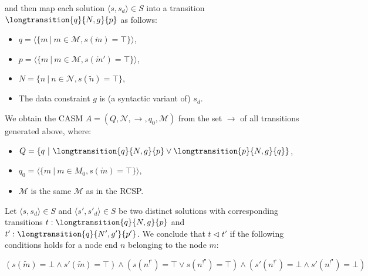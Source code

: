 and then map each solution $\langle s, s_d \rangle \in S$ into a transition $\longtransition{q}{N, g}{p}$ as follows: 
\begin{itemize}
	\item $q = \langle\{m ~|~ m \in \mathcal{M}, s\left(\mathring{m}\right) = \top \}\rangle$,
	\item $p = \langle\{m ~|~ m \in \mathcal{M}, s\left(\mathring{m}'\right) = \top \}\rangle$,
	\item $N =  \{ n ~|~ n \in \mathcal{N}, s\left(\tilde{n}\right) = \top \}$,%
	\item The data constraint $g$ is (a syntactic variant of) $s_d$. 
\end{itemize} 

We obtain the CASM $A=\left( Q, \mathcal{N}, \rightarrow, q_0, \mathcal{M} \right)$ from the set $\longrightarrow$ of all transitions generated above, where: %
\begin{itemize}
	\item $Q = \{q ~|~ \longtransition{q}{N, g}{p} \vee \longtransition{p}{N, g}{q} \}$, 
	\item $q_0 = \langle\{m~|~ m \in M_0, s(\mathring{m}) = \top \}\rangle$, 
	\item $\mathcal{M}$ is the same $\mathcal{M}$ as in the RCSP.
\end{itemize}

Let $\langle s, s_d \rangle \in S$ and $\langle s', s'_d \rangle \in S$ be two distinct solutions with corresponding transitions $t : \longtransition{q}{N, g}{p}$ and $t' : \longtransition{q}{N', g'}{p'}$. We conclude that $t \triangleleft t'$ if the following conditions holds for a node end $n$ belonging to the node $m$:

$$(s(\tilde{m}) = \bot \wedge s'(\tilde{m}) = \top) \wedge 
 (s(n^{!^\circ}) = \top \vee s(n^{!^\bullet}) = \top) \wedge 
 (s'(n^{!^\circ}) = \bot \wedge s'(n^{!^\bullet}) = \bot)$$ %

